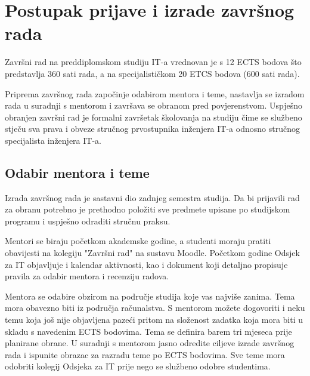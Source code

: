 \section{Postupak prijave i izrade završnog rada}
Završni rad na preddiplomskom studiju IT-a vrednovan je s 12 ECTS bodova što predstavlja 360 sati rada, a na specijalističkom 20 ETCS bodova (600 sati rada). %

Priprema završnog rada započinje odabirom mentora i teme, nastavlja se izradom rada u suradnji s mentorom i završava se obranom pred povjerenstvom. Uspješno obranjen završni rad je formalni završetak školovanja na studiju čime se službeno stječu sva prava i obveze stručnog prvostupnika inženjera IT-a odnosno stručnog specijalista inženjera IT-a. 

\subsection{Odabir mentora i teme}
Izrada završnog rada je sastavni dio zadnjeg semestra studija. Da bi prijavili rad za obranu potrebno je prethodno položiti sve predmete upisane po studijskom programu i uspješno odraditi stručnu praksu.

Mentori se biraju početkom akademske godine, a studenti moraju pratiti obavijesti na kolegiju "Završni rad" na sustavu Moodle. Početkom godine Odsjek za IT objavljuje i kalendar aktivnosti, kao i dokument koji detaljno propisuje pravila za odabir mentora i recenziju radova.

Mentora se odabire obzirom na područje studija koje vas najviše zanima. Tema mora obavezno biti iz područja računalstva. S mentorom možete dogovoriti i neku temu koja još nije objavljena pazeći pritom na složenost zadatka koja mora biti u skladu s navedenim ECTS bodovima. Tema se definira barem tri mjeseca prije planirane obrane. U suradnji s mentorom jasno odredite ciljeve izrade završnog rada i ispunite obrazac za razradu teme po ECTS bodovima. Sve teme mora odobriti kolegij Odsjeka za IT prije nego se službeno odobre studentima.

